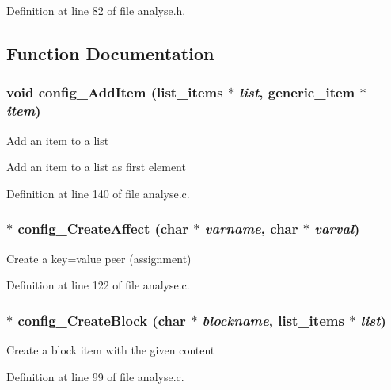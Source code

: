 Definition at line 82 of file analyse.h.

\subsection{Function Documentation}
\subsubsection[{config\_\-AddItem}]{\setlength{\rightskip}{0pt plus 5cm}void config\_\-AddItem ({\bf list\_\-items} $\ast$ {\em list}, \/  {\bf generic\_\-item} $\ast$ {\em item})}\label{analyse_8h_4f7005314a823e91e222533981b18286}


Add an item to a list

Add an item to a list as first element 

Definition at line 140 of file analyse.c.
\subsubsection[{config\_\-CreateAffect}]{$\ast$ config\_\-CreateAffect (char $\ast$ {\em varname}, \/  char $\ast$ {\em varval})}\label{analyse_8h_19694ceaab9125cba46213b5f0857676}


Create a key=value peer (assignment) 

Definition at line 122 of file analyse.c.
\subsubsection[{config\_\-CreateBlock}]{$\ast$ config\_\-CreateBlock (char $\ast$ {\em blockname}, \/  {\bf list\_\-items} $\ast$ {\em list})}\label{analyse_8h_be9e49a5e342b113519db7bcb9ad8ee3}


Create a block item with the given content 

Definition at line 99 of file analyse.c.
